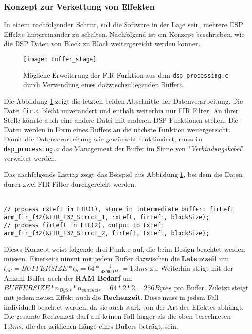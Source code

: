 \subsubsection{Konzept zur Verkettung von Effekten}
\label{sec:DSPChaining}

In einem nachfolgenden Schritt, soll die Software in der Lage sein, mehrere DSP Effekte hintereinander zu schalten. Nachfolgend ist ein Konzept beschrieben, wie die DSP Daten von Block zu Block weitergereicht werden können.

\begin{figure}[H]
	\centering
	\texttt{[image: Buffer\_stage]}
	\caption{Mögliche Erweiterung der FIR Funktion aus dem \texttt{dsp\_processing.c} durch Verwendung eines dazwischenliegenden Buffers.}
	\label{pic:Buffer_stage}
\end{figure}

Die Abbildung \ref{pic:Buffer_stage} zeigt die letzten beiden Abschnitte der Datenverarbeitung. Die Datei \texttt{fir.c} bleibt unverändert und enthält weiterhin nur FIR Filter. An ihrer Stelle könnte auch eine andere Datei mit anderen DSP Funktionen stehen.
Die Daten werden in Form eines Buffers an die nächste Funktion weitergereicht.
Damit die Datenverarbeitung wie gewünscht funktioniert, muss im \texttt{dsp\_processing.c} das Management der Buffer im Sinne von "\textit{Verbindungskabel}" verwaltet werden.

Das nachfolgende Listing zeigt das Beispiel aus Abbildung \ref{pic:Buffer_stage}, bei dem die Daten durch zwei FIR Filter durchgereicht werden.\\
\\

\begin{lstlisting}[style=Cuvision, caption={Daten mittels Buffer und zwei FIR Filter bearbeiten}]
// process rxLeft in FIR(1), store in intermediate buffer: firLeft
arm_fir_f32(&FIR_F32_Struct_1, rxLeft, firLeft, blockSize);
// process firLeft in FIR(2), output to txLeft
arm_fir_f32(&FIR_F32_Struct_2, firLeft, txLeft, blockSize);

\end{lstlisting}

Dieses Konzept weist folgende drei Punkte auf, die beim Design beachtet werden müssen.
Einerseits nimmt mit jedem Buffer dazwischen die \textbf{Latenzzeit} um $t_{lat}=BUFFERSIZE*t_S=64*\frac{1}{48'000\si{Hz}}=1.3\si{ms}$ zu.
Weiterhin steigt mit der Anzahl Buffer auch der \textbf{RAM Bedarf} um $BUFFERSIZE*n_{Bytes}*n_{channels}=64*2*2=256\si{Bytes}$ pro Buffer.
Zuletzt steigt mit jedem neuen Effekt auch die \textbf{Rechenzeit}. Diese muss in jedem Fall individuell beachtet werden, da sie auch stark von der Art des Effektes abhängt.
Die gesamte Rechenzeit darf auf keinen Fall länger als die oben berechneten $1.3\si{ms}$, die der zeitlichen Länge eines Buffers beträgt, sein.

